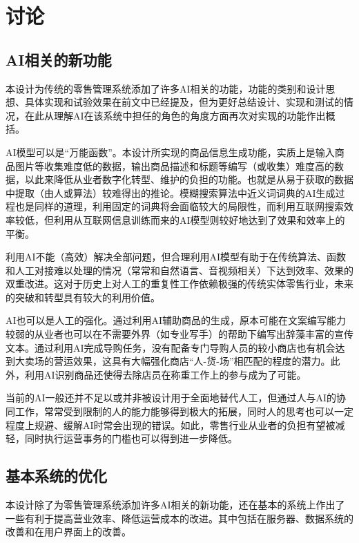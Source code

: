 \newpage
\section{讨论}
\label{sec:discussion}

\subsection{AI相关的新功能}

本设计为传统的零售管理系统添加了许多AI相关的功能，功能的类别和设计思想、具体实现和试验效果在前文中已经提及，但为更好总结设计、实现和测试的情况，在此从理解AI在该系统中担任的角色的角度方面再次对实现的功能作出概括。

AI模型可以是“万能函数”。本设计所实现的商品信息生成功能，实质上是输入商品图片等收集难度低的数据，输出商品描述和标题等编写（或收集）难度高的数据，以此来降低从业者数字化转型、维护的负担的功能。也就是从易于获取的数据中提取（由人或算法）较难得出的推论。模糊搜索算法中近义词词典的AI生成过程也是同样的道理，利用固定的词典将会面临较大的局限性，而利用互联网搜索效率较低，但利用从互联网信息训练而来的AI模型则较好地达到了效果和效率上的平衡。

利用AI不能（高效）解决全部问题，但合理利用AI模型有助于在传统算法、函数和人工对接难以处理的情况（常常和自然语言、音视频相关）下达到效率、效果的双重改进。这对于历史上对人工的重复性工作依赖极强的传统实体零售行业，未来的突破和转型具有较大的利用价值。

AI也可以是人工的强化。通过利用AI辅助商品的生成，原本可能在文案编写能力较弱的从业者也可以在不需要外界（如专业写手）的帮助下编写出辞藻丰富的宣传文本。通过利用AI完成导购任务，没有配备专门导购人员的较小商店也有机会达到大卖场的营运效果，这具有大幅强化商店“人-货-场”相匹配的程度的潜力。此外，利用AI识别商品还使得去除店员在称重工作上的参与成为了可能。

当前的AI一般还并不足以或并非被设计用于全面地替代人工，但通过人与AI的协同工作，常常受到限制的人的能力能够得到极大的拓展，同时人的思考也可以一定程度上规避、缓解AI时常会出现的错误。如此，零售行业从业者的负担有望被减轻，同时执行运营事务的门槛也可以得到进一步降低。

\subsection{基本系统的优化}

本设计除了为零售管理系统添加许多AI相关的新功能，还在基本的系统上作出了一些有利于提高营业效率、降低运营成本的改进。其中包括在服务器、数据系统的改善和在用户界面上的改善。

